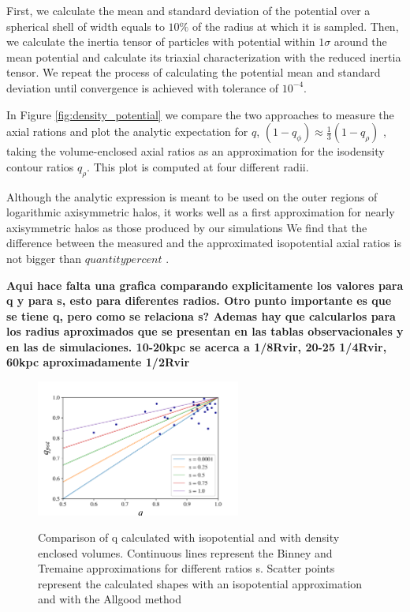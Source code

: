 \documentclass[a4paper,fleqn,usenatbib]{mnras}
\begin{document}
First, we calculate the mean and standard deviation of the potential over a
spherical shell of width equals to $10\%$ of the radius at which it is
sampled. 
Then, we calculate the inertia tensor of particles with potential
within $1\sigma$ around the mean potential and calculate its triaxial
characterization with the reduced inertia tensor. 
We repeat the
process of calculating the potential mean and standard deviation until
convergence is achieved with tolerance of $10^{-4}$. 

In Figure \ref{fig:density_potential} we compare the two approaches to
measure the axial rations and plot the analytic expectation for $q$, 
$(1-q_{\phi})\approx \frac{1}{3}(1-q_{\rho})$
\citep{Binney_and_Tremaine_2008}, taking the volume-enclosed axial
ratios  as an approximation for the isodensity contour ratios
$q_{\rho}$. 
This plot is computed at four different radii.

Although the analytic expression is meant to be used on the outer
regions of logarithmic axisymmetric halos, it works well as a first
approximation for nearly axisymmetric halos as those produced by our
simulations 
We find that the difference between the measured and the
approximated isopotential axial ratios is not bigger than $quantity
percent$ {\bf }. 


{\bf Aqui hace falta una grafica comparando explicitamente los
  valores para q y para s, esto para diferentes radios.
  Otro punto importante es que se tiene q, pero como se
  relaciona s?
  Ademas hay que calcularlos para los radius aproximados que se
  presentan en las tablas observacionales y en las de simulaciones.
  10-20kpc se acerca a 1/8Rvir, 20-25 1/4Rvir, 60kpc aproximadamente 1/2Rvir
}

\begin{figure}
\centering
{\includegraphics[width=0.6\textwidth]{./pics/Shape_Methods/q_pot_Vs_q_den.png}}
\caption{Comparison of q calculated with isopotential and with density enclosed volumes. Continuous lines represent the Binney and Tremaine approximations for different ratios s. Scatter points represent the calculated shapes with an isopotential approximation and with the Allgood method} \label{fig:shape_comp}
\end{figure} 
\end{document}
